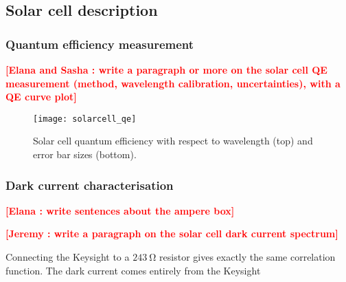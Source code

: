 \documentclass[printer]{aa}
\newcommand{\todo}[1]{\textbf{\textcolor{red}{[#1]}}\xspace}
\begin{document}
\subsection{Solar cell description}

\subsubsection{Quantum efficiency measurement}
 
\todo{Elana and Sasha : write a paragraph or more on the solar cell QE measurement (method, wavelength calibration, uncertainties), with a QE curve plot}

\begin{figure}[!h]
\centering
\texttt{[image: solarcell\_qe]}
\caption{Solar cell quantum efficiency with respect to wavelength (top) and error bar sizes (bottom).}
\end{figure}

\subsubsection{Dark current characterisation}

\todo{Elana : write sentences about the ampere box}

\todo{Jeremy : write a paragraph on the solar cell dark current spectrum}


Connecting the Keysight to a $\SI{243}{\ohm}$ resistor gives exactly the same
correlation function. The dark current comes entirely from the Keysight
\end{document}
